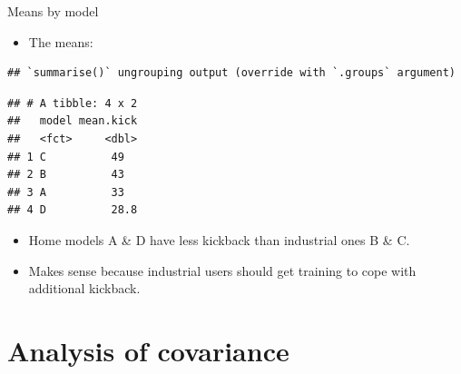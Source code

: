 \documentclass[
  ignorenonframetext,
]{beamer}
\newenvironment{Shaded}{\begin{snugshade}}{\end{snugshade}}
\newcommand{\DataTypeTok}[1]{\textcolor[rgb]{0.13,0.29,0.53}{#1}}
\newcommand{\KeywordTok}[1]{\textcolor[rgb]{0.13,0.29,0.53}{\textbf{#1}}}
\newcommand{\NormalTok}[1]{#1}
\newcommand{\OperatorTok}[1]{\textcolor[rgb]{0.81,0.36,0.00}{\textbf{#1}}}
\newcommand{\StringTok}[1]{\textcolor[rgb]{0.31,0.60,0.02}{#1}}
\providecommand{\tightlist}{%
  \setlength{\itemsep}{0pt}\setlength{\parskip}{0pt}}
\begin{document}
\begin{frame}[fragile]{Means by model}
\protect\hypertarget{means-by-model}{}

\begin{itemize}
\tightlist
\item
  The means:
\end{itemize}

\footnotesize

\begin{Shaded}
\end{Shaded}

\begin{verbatim}
## `summarise()` ungrouping output (override with `.groups` argument)
\end{verbatim}

\begin{verbatim}
## # A tibble: 4 x 2
##   model mean.kick
##   <fct>     <dbl>
## 1 C          49  
## 2 B          43  
## 3 A          33  
## 4 D          28.8
\end{verbatim}

\small

\begin{itemize}
\item
  Home models A \& D have less kickback than industrial ones B \& C.
\item
  Makes sense because industrial users should get training to cope with
  additional kickback.
\end{itemize}

\normalsize

\end{frame}

\hypertarget{analysis-of-covariance}{%
\section{Analysis of covariance}\label{analysis-of-covariance}}
\end{document}
